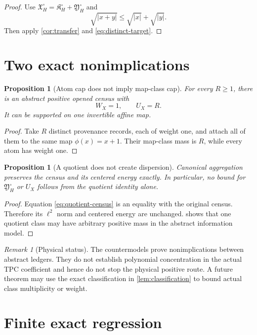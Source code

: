 \documentclass[11pt]{article}
\newtheorem{proposition}[theorem]{Proposition}
\theoremstyle{definition}
\theoremstyle{remark}
\newtheorem{remark}[theorem]{Remark}
\begin{document}
\begin{proof}
Use \(\mathfrak X_H^\circ=\mathfrak K_H^\circ+
\mathfrak Y_H^\circ\) and
\[
 \sqrt{|x+y|}\le\sqrt{|x|}+\sqrt{|y|}.
\]
Then apply \cref{cor:transfer} and \eqref{eq:distinct-target}.
\end{proof}

\section{Two exact nonimplications}
\label{sec:nonimplications}

\begin{proposition}[Atom cap does not imply map-class cap]
\label{prop:atom-vs-map}
For every \(R\ge1\), there is an abstract positive opened census
with
\[
 W_X=1,\qquad U_X=R.
\]
It can be supported on one invertible affine map.
\end{proposition}

\begin{proof}
Take \(R\) distinct provenance records, each of weight one, and
attach all of them to the same map \(\phi(x)=x+1\).  Their map-class
mass is \(R\), while every atom has weight one.
\end{proof}

\begin{proposition}[A quotient does not create dispersion]
\label{prop:no-dispersion}
Canonical aggregation preserves the census and its centered energy
exactly.  In particular, no bound for
\(\mathfrak Y_H^\circ\) or \(U_X\) follows from the quotient
identity alone.
\end{proposition}

\begin{proof}
Equation \eqref{eq:quotient-census} is an equality with the original
census.  Therefore its \(\ell^2\) norm and centered energy are
unchanged.   shows that one quotient class
may have arbitrary positive mass in the abstract information
model.
\end{proof}

\begin{remark}[Physical status]
The countermodels prove nonimplications between abstract ledgers.
They do not establish polynomial concentration in the actual TPC
coefficient and hence do not stop the physical positive route.  A
future theorem may use the exact classification in
\cref{lem:classification} to bound actual class multiplicity or
weight.
\end{remark}

\section{Finite exact regression}
\label{sec:certificate}
\end{document}

